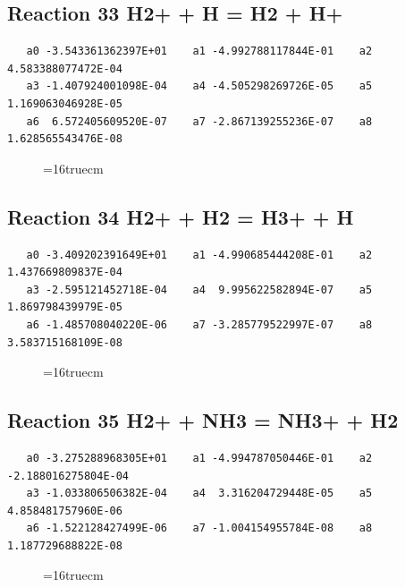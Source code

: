 \documentclass[12pt,dvipdfm]{article}
\begin{document}
\subsection{
Reaction 33 H2+ + H = H2 + H+}
\begin{small}\begin{verbatim}
   a0 -3.543361362397E+01    a1 -4.992788117844E-01    a2  4.583388077472E-04
   a3 -1.407924001098E-04    a4 -4.505298269726E-05    a5  1.169063046928E-05
   a6  6.572405609520E-07    a7 -2.867139255236E-07    a8  1.628565543476E-08
   \end{verbatim}\end{small}
\begin{figure}[h!]
\label{n2rates}
\epsfxsize=16truecm
\end{figure}
\newpage

\subsection{
Reaction 34 H2+ + H2 = H3+ + H}
\begin{small}\begin{verbatim}
   a0 -3.409202391649E+01    a1 -4.990685444208E-01    a2  1.437669809837E-04
   a3 -2.595121452718E-04    a4  9.995622582894E-07    a5  1.869798439979E-05
   a6 -1.485708040220E-06    a7 -3.285779522997E-07    a8  3.583715168109E-08
   \end{verbatim}\end{small}
\begin{figure}[h!]
\label{n2rates}
\epsfxsize=16truecm
\end{figure}
\newpage

\subsection{
Reaction 35 H2+ + NH3 = NH3+ + H2}
\begin{small}\begin{verbatim}
   a0 -3.275288968305E+01    a1 -4.994787050446E-01    a2 -2.188016275804E-04
   a3 -1.033806506382E-04    a4  3.316204729448E-05    a5  4.858481757960E-06
   a6 -1.522128427499E-06    a7 -1.004154955784E-08    a8  1.187729688822E-08
   \end{verbatim}\end{small}
\begin{figure}[h!]
\label{n2rates}
\epsfxsize=16truecm
\end{figure}
\newpage
\end{document}
